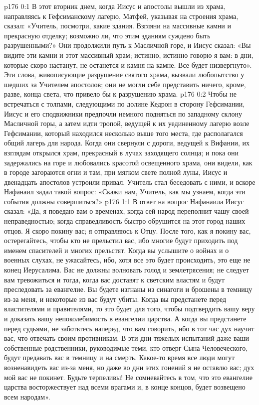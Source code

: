 \author{Комиссия срединников}
\vs p176 0:1 В этот вторник днем, когда Иисус и апостолы вышли из храма, направляясь к Гефсиманскому лагерю, Матфей, указывая на строения храма, сказал: «Учитель, посмотри, какие здания. Взгляни на массивные камни и прекрасную отделку; возможно ли, что этим зданиям суждено быть разрушенными?» Они продолжили путь к Масличной горе, и Иисус сказал: «Вы видите эти камни и этот массивный храм; истинно, истинно говорю я вам: в дни, которые скоро настанут, не останется и камня на камне. Все будет низвергнуто». Эти слова, живописующие разрушение святого храма, вызвали любопытство у шедших за Учителем апостолов; они не могли себе представить ничего, кроме, разве, конца света, что привело бы к разрушению храма.
\vs p176 0:2 Чтобы не встречаться с толпами, следующими по долине Кедрон в сторону Гефсимании, Иисус и его сподвижники предпочли немного подняться по западному склону Масличной горы, а затем идти тропой, ведущей к их уединенному лагерю возле Гефсимании, который находился несколько выше того места, где располагался общий лагерь для народа. Когда они свернули с дороги, ведущей к Вифании, их взглядам открылся храм, прекрасный в лучах заходящего солнца; и пока они задержались на горе и любовались красотой освещенного храма, они видели, как в городе загораются огни и там, при мягком свете полной луны, Иисус и двенадцать апостолов устроили привал. Учитель стал беседовать с ними, и вскоре Нафанаил задал такой вопрос: «Скажи нам, Учитель, как мы узнаем, когда эти события должны совершиться?»
\vs p176 1:1 В ответ на вопрос Нафанаила Иисус сказал: «Да, я поведаю вам о временах, когда сей народ переполнит чашу своей неправедностью; когда справедливость быстро обрушится на этот город наших отцов. Я скоро покину вас; я отправляюсь к Отцу. После того, как я покину вас, остерегайтесь, чтобы кто не прельстил вас, ибо многие будут приходить под именем спасителей и многих прельстят. Когда вы услышите о войнах и о военных слухах, не ужасайтесь, ибо, хотя все это будет происходить, это еще не конец Иерусалима. Вас не должны волновать голод и землетрясения; не следует вам тревожиться и тогда, когда вас доставят к светским властям и будут преследовать за евангелие. Вы будете изгнаны из синагоги и брошены в темницу из\hyp{}за меня, и некоторые из вас будут убиты. Когда вы предстанете перед властителями и правителями, то это будет для того, чтобы подтвердить вашу веру и доказать вашу непоколебимость в евангелии царства. А когда вы предстанете перед судьями, не заботьтесь наперед, что вам говорить, ибо в тот час дух научит вас, что отвечать своим противникам. В эти дни тяжелых испытаний даже ваши собственные родственники, руководимые теми, кто отверг Сына Человеческого, будут предавать вас в темницу и на смерть. Какое\hyp{}то время все люди могут возненавидеть вас из\hyp{}за меня, но даже во дни этих гонений я не оставлю вас; дух мой вас не покинет. Будьте терпеливы! Не сомневайтесь в том, что это евангелие царства восторжествует над всеми врагами и, в конце концов, будет возвещено всем народам».
